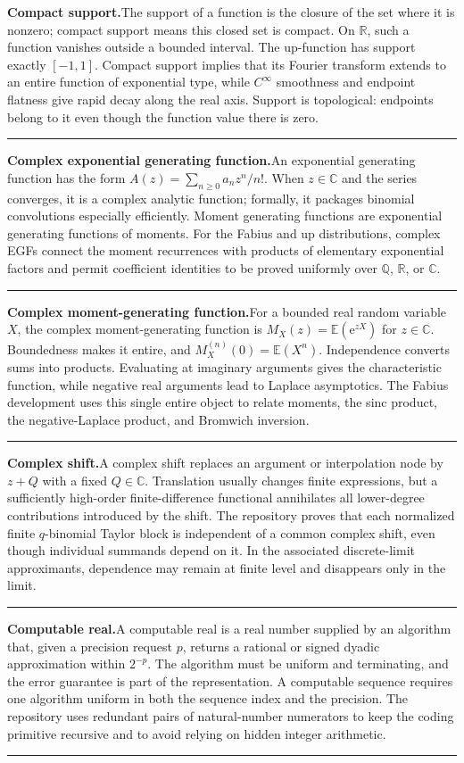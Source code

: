 \documentclass[11pt,oneside]{article}
\newcommand{\R}{\mathbb R}
\newcommand{\C}{\mathbb C}
\newcommand{\Q}{\mathbb Q}
\newcommand{\e}{\mathrm e}
\newcommand{\E}{\mathbb E}
\newcommand{\glossaryentry}[3]{%
  \par\addvspace{0.95\baselineskip}%
  \phantomsection\hypertarget{gls:#1}{}%
  \noindent\textbf{\large #2.}\enspace #3\par
  \nopagebreak[2]\vspace{0.15\baselineskip}%
  \noindent\color{rulegray}\rule{\linewidth}{0.25pt}\color{black}%
}
\begin{document}
\glossaryentry{compact-support}{Compact support}{The support of a function is the closure of the set where it is nonzero; compact support means this closed set is compact. On \(\R\), such a function vanishes outside a bounded interval. The up-function has support exactly \([-1,1]\). Compact support implies that its Fourier transform extends to an entire function of exponential type, while \(C^\infty\) smoothness and endpoint flatness give rapid decay along the real axis. Support is topological: endpoints belong to it even though the function value there is zero.}
\glossaryentry{complex-exponential-generating-function}{Complex exponential generating function}{An exponential generating function has the form \(A(z)=\sum_{n\ge0}a_nz^n/n!\). When \(z\in\C\) and the series converges, it is a complex analytic function; formally, it packages binomial convolutions especially efficiently. Moment generating functions are exponential generating functions of moments. For the Fabius and up distributions, complex EGFs connect the moment recurrences with products of elementary exponential factors and permit coefficient identities to be proved uniformly over \(\Q\), \(\R\), or \(\C\).}
\glossaryentry{complex-moment-generating-function}{Complex moment-generating function}{For a bounded real random variable \(X\), the complex moment-generating function is \(M_X(z)=\E(\e^{zX})\) for \(z\in\C\). Boundedness makes it entire, and \(M_X^{(n)}(0)=\E(X^n)\). Independence converts sums into products. Evaluating at imaginary arguments gives the characteristic function, while negative real arguments lead to Laplace asymptotics. The Fabius development uses this single entire object to relate moments, the sinc product, the negative-Laplace product, and Bromwich inversion.}
\glossaryentry{complex-shift}{Complex shift}{A complex shift replaces an argument or interpolation node by \(z+Q\) with a fixed \(Q\in\C\). Translation usually changes finite expressions, but a sufficiently high-order finite-difference functional annihilates all lower-degree contributions introduced by the shift. The repository proves that each normalized finite \(q\)-binomial Taylor block is independent of a common complex shift, even though individual summands depend on it. In the associated discrete-limit approximants, dependence may remain at finite level and disappears only in the limit.}
\glossaryentry{computable-real}{Computable real}{A computable real is a real number supplied by an algorithm that, given a precision request \(p\), returns a rational or signed dyadic approximation within \(2^{-p}\). The algorithm must be uniform and terminating, and the error guarantee is part of the representation. A computable sequence requires one algorithm uniform in both the sequence index and the precision. The repository uses redundant pairs of natural-number numerators to keep the coding primitive recursive and to avoid relying on hidden integer arithmetic.}
\end{document}
